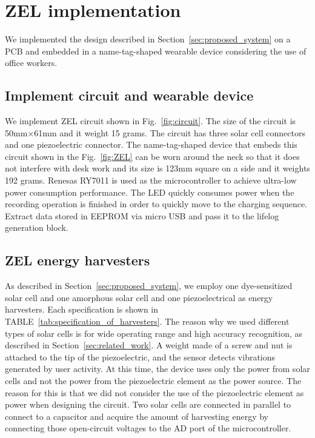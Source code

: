 \documentclass[conference]{IEEEtran}
\begin{document}
\section{ZEL implementation} \label{sec:implementation}
We implemented the design described in Section~\ref{sec:proposed_system} on a PCB and embedded in a name-tag-shaped wearable device considering the use of office workers.

\subsection{Implement circuit and wearable device}
We implement ZEL circuit shown in Fig.~\ref{fig:circuit}.
The size of the circuit is 50mm$\times$61mm and it weight 15 grams.
The circuit has three solar cell connectors and one piezoelectric connector.
The name-tag-shaped device that embeds this circuit shown in the Fig.~\ref{fig:ZEL} can be worn around the neck so that it does not interfere with desk work and its size is 123mm square on a side and it weights 192 grams.
Renesas RY7011 is used as the microcontroller to achieve ultra-low power consumption performance.
The LED quickly consumes power when the recording operation is finished in order to quickly move to the charging sequence.
Extract data stored in EEPROM via micro USB and pass it to the lifelog generation block.

\subsection{ZEL energy harvesters}
As described in Section~\ref{sec:proposed_system}, we employ one dye-sensitized solar cell and one amorphous solar cell and one piezoelectrical as energy harvesters.
Each specification is shown in TABLE~\ref{tab:specification_of_harvesters}.
The reason why we used different types of solar cells is for wide operating range and high accuracy recognition, as described in Section~\ref{sec:related_work}.
A weight made of a screw and nut is attached to the tip of the piezoelectric, and the sensor detects vibrations generated by user activity.
At this time, the device uses only the power from solar cells and not the power from the piezoelectric element as the power source.
The reason for this is that we did not consider the use of the piezoelectric element as power when designing the circuit.
Two solar cells are connected in parallel to connect to a capacitor and acquire the amount of harvesting energy by connecting those open-circuit voltages to the AD port of the microcontroller.
\end{document}
